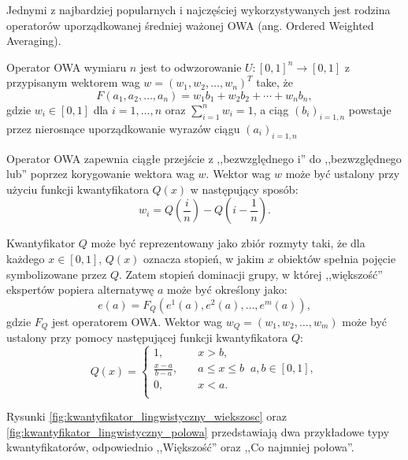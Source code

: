 Jednymi z najbardziej popularnych i najczęściej wykorzystywanych jest rodzina
operatorów uporządkowanej średniej ważonej OWA (ang. Ordered Weighted
Averaging).

\begin{definition}
Operator OWA wymiaru $n$ jest to odwzorowanie $U : [0,1]^n \rightarrow [0,1]$
z przypisanym wektorem wag $w=(w_1,w_2,\dotsc,w_n)^T$ take, że
\begin{equation}
F(a_1,a_2,\dotsc,a_n) = w_1b_1 + w_2b_2 + \dotsb + w_nb_n,
\end{equation}
gdzie $w_i \in [0,1]$ dla $i=1,\dotsc, n$ oraz $\sum_{i=1}^{n} w_i = 1$, a ciąg
$(b_i)_{i=1,n}$ powstaje przez nierosnące uporządkowanie wyrazów ciągu
$(a_i)_{i=1,n}$
\end{definition}

Operator OWA zapewnia ciągłe przejście z ,,bezwzględnego i'' do ,,bezwzględnego
lub'' poprzez korygowanie wektora wag $w$. Wektor wag $w$ może być ustalony przy
użyciu funkcji kwantyfikatora $Q(x)$ w następujący sposób:
$$w_i = Q(\frac{i}{n}) - Q(i - \frac{1}{n}).$$

Kwantyfikator $Q$ może być reprezentowany jako zbiór rozmyty taki, że dla
każdego $x \in [0,1]$, $Q(x)$ oznacza stopień, w jakim $x$ obiektów spełnia
pojęcie symbolizowane przez $Q$. Zatem stopień dominacji grupy, w której
,,większość'' ekspertów popiera alternatywę $a$ może być określony jako:
$$e(a) = F_Q(e^1(a),e^2(a),\dotsc,e^m(a)),$$
gdzie $F_Q$ jest operatorem OWA. Wektor wag $w_Q = (w_1,w_2,\dotsc,w_m)$ może
być ustalony przy pomocy następującej funkcji kwantyfikatora $Q$:
$$
Q(x) = 
\left\{ 
	\begin{array}{cl}
	  1	,				& \quad  x > b, \\
      \frac{x-a}{b-a}, 	& \quad  a \leq x \leq b \;\; a,b \in [0,1], \\
      0 ,				& \quad  x < a. \\
  	\end{array} 
  \right.
$$

Rysunki \ref{fig:kwantyfikator_lingwistyczny_wiekszosc} oraz
\ref{fig:kwantyfikator_lingwistyczny_polowa} przedstawiają dwa przykładowe typy
kwantyfikatorów, odpowiednio ,,Większość'' oraz ,,Co najmniej połowa''.

